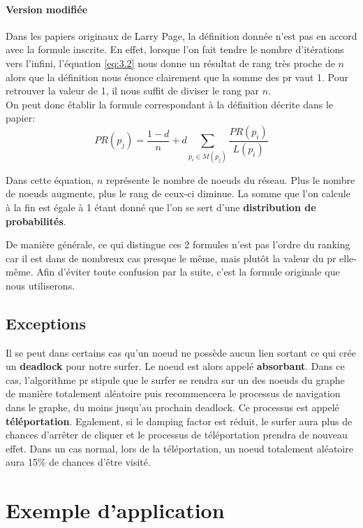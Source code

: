 \documentclass[12pt,twoside, openright]{memoir}
\begin{document}
	\paragraph*{Version modifiée} Dans les papiers originaux de Larry Page, la définition donnée n'est pas en accord avec la formule inscrite. En effet, lorsque l'on fait tendre le nombre d'itérations vers l'infini, l'équation \ref{eq:3.2} nous donne un résultat de rang très proche de $n$ alors que la définition nous énonce clairement que la somme des \gls{pr} vaut 1. Pour retrouver la valeur de 1, il nous suffit de diviser le rang par $n$.\\
	On peut donc établir la formule correspondant à la définition décrite dans le papier:
	\begin{equation}\label{eq:3.3}
	PR(p_j) = \frac{1-d}{n}+d\sum_{p_i\in M(p_j)}\frac{PR(p_i)}{L(p_i)}
	\end{equation}\par
	Dans cette équation, $n$ représente le nombre de noeuds du réseau. Plus le nombre de noeuds augmente, plus le rang de ceux-ci diminue. La somme que l'on calcule à la fin est égale à 1 étant donné que l'on se sert d'une \textbf{distribution de probabilités}.\par
	De manière générale, ce qui distingue ces 2 formules n'est pas l'ordre du ranking car il est dans de nombreux cas presque le même, mais plutôt la valeur du \gls{pr} elle-même. Afin d'éviter toute confusion par la suite, c'est la formule originale que nous utiliserons.
	\subsection{Exceptions}
	Il se peut dans certains cas qu'un noeud ne possède aucun lien sortant ce qui crée un \textbf{deadlock} pour notre surfer. Le noeud est alors appelé \textbf{absorbant}. Dans ce cas, l'algorithme \gls{pr} stipule que le surfer se rendra sur un des noeuds du graphe de manière totalement aléatoire puis recommencera le processus de navigation dans le graphe, du moins jusqu'au prochain deadlock. Ce processus est appelé \textbf{téléportation}. Egalement, si le damping factor est réduit, le surfer aura plus de chances d'arrêter de cliquer et le processus de téléportation prendra de nouveau effet. Dans un cas normal, lors de la téléportation, un noeud totalement aléatoire aura 15\% de chances d'être visité.
	\section{Exemple d'application}
\end{document}
